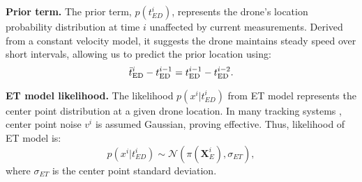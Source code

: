 \textbf{Prior term.} 
The prior term, $p(t_{ED}^i)$, represents the drone's location probability distribution at time $i$ unaffected by current measurements. Derived from a constant velocity model, it suggests the drone maintains steady speed over short intervals, allowing us to predict the prior location using:
\begin{equation}
\vspace{-0.1cm}
\bar{t}_{\mathrm{ED}}^i-t_{\mathrm{ED}}^{i-1}=t_{\mathrm{ED}}^{i-1}-t_{\mathrm{ED}}^{i-2}.
\end{equation}

\textbf{ET model likelihood.} 
The likelihood $p(x^i|t_{ED}^i)$ from ET model represents the center point distribution at a given drone location. 
In many tracking systems \cite{campos2021orb}, center point noise $v^i$ is assumed Gaussian, proving effective. Thus, likelihood of ET model is:
\begin{equation}
p(x^i|t_{ED}^i) \sim \mathcal{N}(\pi(\textbf{X}_E^i), \sigma_{ET}),
\end{equation}
where $\sigma_{ET}$ is the center point standard deviation.

